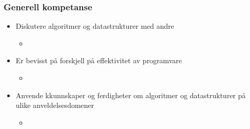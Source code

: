 \documentclass{article}
\begin{document}
    \subsubsection{Generell kompetanse}
    \begin{itemize}
        \item Diskutere algoritmer og datastrukturer med andre
            \begin{itemize}
                \item \color{red}{Gruppetimer, samarbeid på oblig}
            \end{itemize}
        \item Er bevisst på forskjell på effektivitet av programvare
            \begin{itemize}
                \item \color{red}{Dekket første uke}
            \end{itemize}
        \item Anvende kkunnskaper og ferdigheter om algoritmer og datastrukturer på ulike anveldelsesdomener
            \begin{itemize}
                \item \color{red}{Problemløsning, ukesoppgaver}
            \end{itemize}
    \end{itemize}
\end{document}
